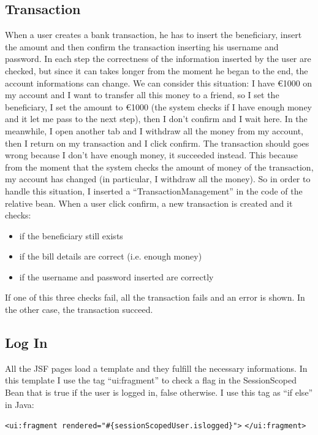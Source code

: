 \documentclass[a4paper]{article}
\begin{document}
\subsection{Transaction}
\label{subsec:trans}
When a user creates a bank transaction, he has to insert the beneficiary, insert the amount and then confirm the transaction inserting his username and password. In each step the correctness of the information inserted by the user are checked, but since it can takes longer from the moment he began to the end, the account informations can change. We can consider this situation: I have \euro{1000} on my account and I want to transfer all this money to a friend, so I set the beneficiary, I set the amount to \euro{1000} (the system checks if I have enough money and it let me pass to the next step), then I don't confirm and I wait here. In the meanwhile, I open another tab and I withdraw all the money from my account, then I return on my transaction and I click confirm. The transaction should goes wrong because I don't have enough money, it succeeded instead. This because from the moment that the system checks the amount of money of the transaction, my account has changed (in particular, I withdraw all the money). So in order to handle this situation, I inserted a ``TransactionManagement'' in the code of the relative bean. When a user click confirm, a new transaction is created and it checks:
\begin{itemize}
  \item if the beneficiary still exists
  \item if the bill details are correct (i.e. enough money)
  \item if the username and password inserted are correctly
\end{itemize}

If one of this three checks fail, all the transaction fails and an error is shown. In the other case, the transaction succeed.

\subsection{Log In}
\label{subsec:login}
All the JSF pages load a template and they fulfill the necessary informations. In this template I use the tag ``ui:fragment'' to check a flag in the SessionScoped Bean that is true if the user is logged in, false otherwise. I use this tag as ``if else'' in Java:

\verb|<ui:fragment rendered="#{sessionScopedUser.islogged}">|
\verb|</ui:fragment>|
\end{document}
